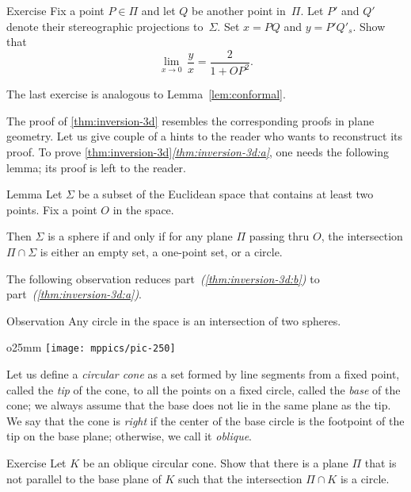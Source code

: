 \begin{thm}{Exercise}\label{ex:conform-sphere}
Fix a point $P\in \Pi$  and let $Q$ be another point in~$\Pi$.
Let $P'$ and $Q'$ denote their stereographic projections to~$\Sigma$.
Set $x=PQ$ and $y=P'Q'_s$.
Show that
$$\lim_{x\to 0}\, \frac{y}{x}=\frac{2}{1+OP^2}.$$
\end{thm}

The last exercise is analogous to Lemma~\ref{lem:conformal}.

The proof of \ref{thm:inversion-3d} resembles the corresponding proofs in plane geometry.
Let us give couple of a hints to the reader who wants to reconstruct its proof.
To prove \ref{thm:inversion-3d}\textit{\ref{thm:inversion-3d:a}}, one needs the following lemma;
its proof is left to the reader.

\begin{thm}{Lemma}
Let $\Sigma$ be a subset of the Euclidean space
that contains at least two points.
Fix a point $O$ in the space.

Then $\Sigma$ is 
a sphere 
if and only if
for any plane $\Pi$ passing thru $O$,
the intersection $\Pi\cap \Sigma$ is either an empty set,
a one-point set, or a circle.
\end{thm}  

The following observation reduces part~\textit{(\ref{thm:inversion-3d:b})} to part~\textit{(\ref{thm:inversion-3d:a})}.

\begin{thm}{Observation}
Any circle in the space is an intersection of two spheres.
\end{thm}

{

\begin{wrapfigure}{o}{25mm}
\centering
\texttt{[image: mppics/pic-250]}
\end{wrapfigure}

Let us define a \emph{circular cone} as a set formed by line segments from a fixed point, called the \emph{tip} of the cone, to all the points on a fixed circle, called the \emph{base} of the cone;
we always assume that the base does not lie in the same plane as the tip.
We say that the cone is \emph{right} 
if the center of the base circle is the footpoint of the tip on the base plane;
otherwise, we call it \emph{oblique}.

}

\begin{thm}{Exercise}\label{ex:cone}
Let $K$ be an oblique circular cone.
Show that there is a plane $\Pi$ that is not parallel to the base plane of $K$ such that the intersection $\Pi\cap K$ is a circle.
\end{thm}

